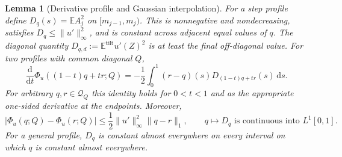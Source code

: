 \documentclass[11pt,a4paper]{article}
\numberwithin{equation}{section}
\newtheorem{lemma}[theorem]{Lemma}
\theoremstyle{definition}
\theoremstyle{remark}
\newcommand{\E}{\mathbb E}
\newcommand{\dd}{\mathrm d}
\begin{document}
\begin{lemma}[Derivative profile and Gaussian interpolation]
\label{lem:hier-row-interpolation}
For a step profile define
$D_q(s)=\E A_j^2$ on $[m_{j-1},m_j)$.  This is nonnegative and
nondecreasing, satisfies $D_q\le\|u'\|_\infty^2$, and is constant across
adjacent equal values of $q$.  The diagonal quantity
$D_{q,d}:=\E^{\mathrm{tilt}}u'(Z)^2$ is at least the final off-diagonal
value.  For two profiles with common diagonal $Q$,
\begin{equation}
 \frac{\dd}{\dd t}\Phi_u((1-t)q+tr;Q)
 =-\frac12\int_0^1(r-q)(s)D_{(1-t)q+tr}(s)\,\dd s.
 \label{eq:src1}
\end{equation}
For arbitrary $q,r\in\mathcal Q_Q$ this identity holds for $0<t<1$ and
as the appropriate one-sided derivative at the endpoints.  Moreover,
\begin{equation}
 |\Phi_u(q;Q)-\Phi_u(r;Q)|
 \le\frac12\|u'\|_\infty^2\|q-r\|_1,
 \qquad q\longmapsto D_q\text{ is continuous into }L^1[0,1].
 \label{eq:hier-row-continuity}
\end{equation}
For a general profile, $D_q$ is constant almost everywhere on every
interval on which $q$ is constant almost everywhere.
\end{lemma}
\end{document}
